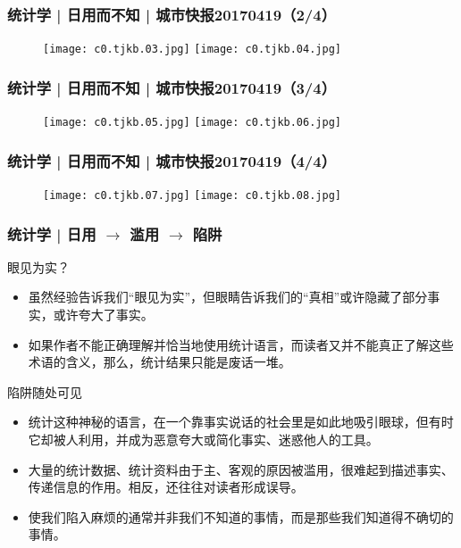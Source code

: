 \begin{frame}
  \frametitle{统计学 | 日用而不知 | 城市快报20170419（2/4）}
  \begin{figure}
    \centering
    \texttt{[image: c0.tjkb.03.jpg]}\quad
    \texttt{[image: c0.tjkb.04.jpg]}
  \end{figure}
\end{frame}

\begin{frame}
  \frametitle{统计学 | 日用而不知 | 城市快报20170419（3/4）}
  \begin{figure}
    \centering
    \texttt{[image: c0.tjkb.05.jpg]}\quad
    \texttt{[image: c0.tjkb.06.jpg]}
  \end{figure}
\end{frame}

\begin{frame}
  \frametitle{统计学 | 日用而不知 | 城市快报20170419（4/4）}
  \begin{figure}
    \centering
    \texttt{[image: c0.tjkb.07.jpg]}\quad
    \texttt{[image: c0.tjkb.08.jpg]}
  \end{figure}
\end{frame}

\begin{frame}
  \frametitle{统计学 | 日用 $\rightarrow$ 滥用 $\rightarrow$ 陷阱}
  \begin{block}{眼见为实？}
    \begin{itemize}
      \item 虽然经验告诉我们“眼见为实”，但眼睛告诉我们的“真相”或许隐藏了部分事实，或许夸大了事实。
      \item 如果作者不能正确理解并恰当地使用统计语言，而读者又并不能真正了解这些术语的含义，那么，统计结果只能是废话一堆。
    \end{itemize}
  \end{block}
  \pause
  \begin{block}{陷阱随处可见}
    \begin{itemize}
      \item 统计这种神秘的语言，在一个靠事实说话的社会里是如此地吸引眼球，但有时它却被人利用，并成为恶意夸大或简化事实、迷惑他人的工具。
      \item 大量的统计数据、统计资料由于主、客观的原因被滥用，很难起到描述事实、传递信息的作用。相反，还往往对读者形成误导。
      \item 使我们陷入麻烦的通常并非我们不知道的事情，而是那些我们知道得不确切的事情。
    \end{itemize}
  \end{block}
\end{frame}

